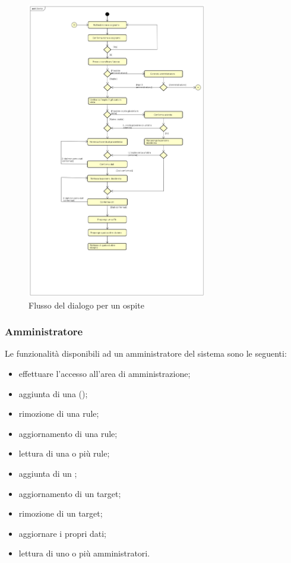 \begin{figure}[h]
	\centerline{\includegraphics[width=0.7\textwidth,height=\textheight,keepaspectratio]{sezioni/images/Utente.png}}
	\caption{Flusso del dialogo per un ospite}\label{fig:flussoOspite}
\end{figure}
\newpage
\subsubsection{Amministratore}\label{admin}
Le funzionalità disponibili ad un amministratore del sistema sono le seguenti:
\begin{itemize}
	\item effettuare l'accesso all'area di amministrazione;
	\item aggiunta di una  ();
	\item rimozione di una rule;
	\item aggiornamento di una rule;
	\item lettura di una o più rule;
	\item aggiunta di un ;
	\item aggiornamento di un target;
	\item rimozione di un target;
	\item aggiornare i propri dati;
	\item lettura di uno o più amministratori.
\end{itemize}
